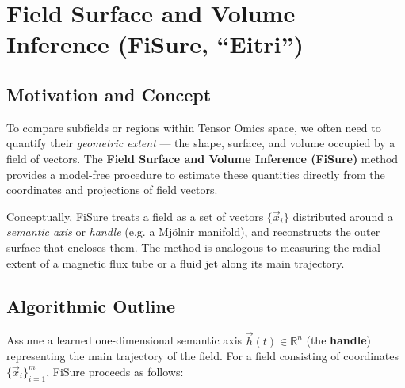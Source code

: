 \section{Field Surface and Volume Inference (FiSure, ``Eitri'')}

    \subsection{Motivation and Concept}

        To compare subfields or regions within Tensor Omics space, we often need 
        to quantify their \textit{geometric extent} --- the shape, surface, and volume 
        occupied by a field of vectors.  
        The \textbf{Field Surface and Volume Inference (FiSure)} method provides a 
        model-free procedure to estimate these quantities directly from the coordinates 
        and projections of field vectors.  

        Conceptually, FiSure treats a field as a set of vectors 
        \( \{\vec{x}_i\} \) distributed around a \textit{semantic axis} or 
        \textit{handle} (e.g. a Mjölnir manifold), and reconstructs the 
        outer surface that encloses them.  
        The method is analogous to measuring the radial extent of a 
        magnetic flux tube or a fluid jet along its main trajectory.

    \subsection{Algorithmic Outline}

        Assume a learned one-dimensional semantic axis 
        \(\vec{h}(t) \in \mathbb{R}^n\) (the \textbf{handle}) representing 
        the main trajectory of the field.  
        For a field consisting of coordinates 
        \( \{\vec{x}_i\}_{i=1}^{m}\), FiSure proceeds as follows:

